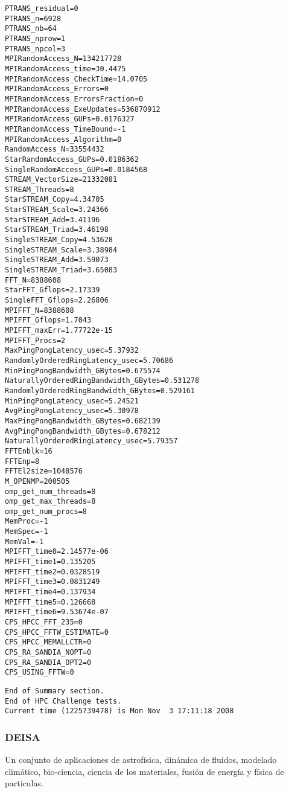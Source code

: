\documentclass[a4paper]{report}
\begin{document}
\begin{minipage}[b]{0.5\linewidth}
\begin{verbatim}
PTRANS_residual=0
PTRANS_n=6928
PTRANS_nb=64
PTRANS_nprow=1
PTRANS_npcol=3
MPIRandomAccess_N=134217728
MPIRandomAccess_time=30.4475
MPIRandomAccess_CheckTime=14.0705
MPIRandomAccess_Errors=0
MPIRandomAccess_ErrorsFraction=0
MPIRandomAccess_ExeUpdates=536870912
MPIRandomAccess_GUPs=0.0176327
MPIRandomAccess_TimeBound=-1
MPIRandomAccess_Algorithm=0
RandomAccess_N=33554432
StarRandomAccess_GUPs=0.0186362
SingleRandomAccess_GUPs=0.0184568
STREAM_VectorSize=21332081
STREAM_Threads=8
StarSTREAM_Copy=4.34705
StarSTREAM_Scale=3.24366
StarSTREAM_Add=3.41196
StarSTREAM_Triad=3.46198
SingleSTREAM_Copy=4.53628
SingleSTREAM_Scale=3.38984
SingleSTREAM_Add=3.59073
SingleSTREAM_Triad=3.65083
FFT_N=8388608
StarFFT_Gflops=2.17339
SingleFFT_Gflops=2.26806
MPIFFT_N=8388608
MPIFFT_Gflops=1.7043
MPIFFT_maxErr=1.77722e-15
MPIFFT_Procs=2
MaxPingPongLatency_usec=5.37932
RandomlyOrderedRingLatency_usec=5.70686
MinPingPongBandwidth_GBytes=0.675574
NaturallyOrderedRingBandwidth_GBytes=0.531278
RandomlyOrderedRingBandwidth_GBytes=0.529161
MinPingPongLatency_usec=5.24521
AvgPingPongLatency_usec=5.30978
MaxPingPongBandwidth_GBytes=0.682139
AvgPingPongBandwidth_GBytes=0.678212
NaturallyOrderedRingLatency_usec=5.79357
FFTEnblk=16
FFTEnp=8
FFTEl2size=1048576
M_OPENMP=200505
omp_get_num_threads=8
omp_get_max_threads=8
omp_get_num_procs=8
MemProc=-1
MemSpec=-1
MemVal=-1
MPIFFT_time0=2.14577e-06
MPIFFT_time1=0.135205
MPIFFT_time2=0.0328519
MPIFFT_time3=0.0831249
MPIFFT_time4=0.137934
MPIFFT_time5=0.126668
MPIFFT_time6=9.53674e-07
CPS_HPCC_FFT_235=0
CPS_HPCC_FFTW_ESTIMATE=0
CPS_HPCC_MEMALLCTR=0
CPS_RA_SANDIA_NOPT=0
CPS_RA_SANDIA_OPT2=0
CPS_USING_FFTW=0
\end{verbatim}
\end{minipage}

\begin{verbatim}
End of Summary section.
End of HPC Challenge tests.
Current time (1225739478) is Mon Nov  3 17:11:18 2008
\end{verbatim}

\subsubsection{DEISA}

Un conjunto de aplicaciones de astrof\'isica, din\'amica de fluidos, modelado clim\'atico,
bio-ciencia, ciencia de los materiales, fusi\'on de energ\'ia y f\'isica de particulas.
\end{document}
